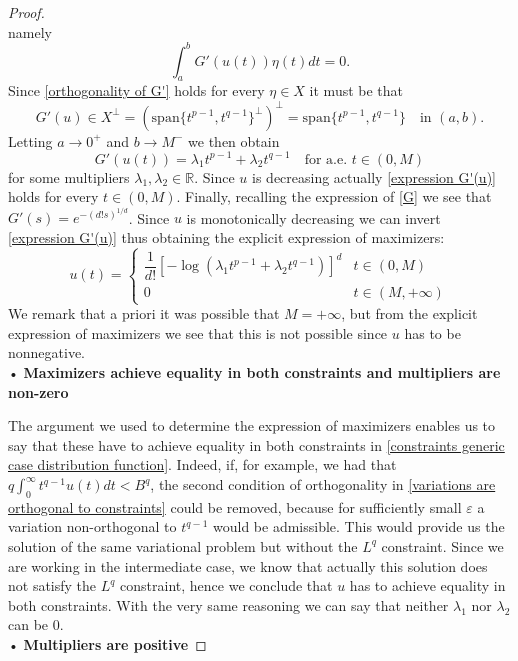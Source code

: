 \documentclass[corpo=11pt, stile=classica, tipotesi=custom,
greek, evenboxes, english]{toptesi}
\numberwithin{equation}{chapter}
\theoremstyle{definition}
\theoremstyle{remark}
\newcommand{\R}{\mathbb{R}} %
\begin{document}
\begin{proof}
\begin{equation*}
\end{equation*}
namely
\begin{equation}\label{orthogonality of G'}
	\int_a^b G'(u(t)) \eta(t) dt = 0. 
\end{equation}
Since \eqref{orthogonality of G'} holds for every $\eta \in X$ it must be that 
\begin{equation*}
	G'(u) \in X^{\perp} = \left(\mathrm{span}\{t^{p-1},t^{q-1}\}^{\perp}\right)^{\perp} = \mathrm{span}\{t^{p-1},t^{q-1}\} \quad \text{in } (a,b).
\end{equation*}
Letting $a \rightarrow 0^+$ and $b \rightarrow M^-$ we then obtain
\begin{equation}\label{expression G'(u)}
	G'(u(t)) = \lambda_1 t^{p-1} + \lambda_2 t^{q-1} \quad \text{for a.e. } t \in (0,M)
\end{equation}
for some multipliers $\lambda_1,\lambda_2 \in \R$. Since $u$ is decreasing actually \eqref{expression G'(u)} holds for every $t \in (0,M)$. Finally, recalling the expression of \eqref{G} we see that $G'(s) = e^{-(d!s)^{1/d}}$. Since $u$ is monotonically decreasing we can invert \eqref{expression G'(u)} thus obtaining the explicit expression of maximizers:
\begin{equation}\label{expression u}
	u(t) = \begin{cases}
		\dfrac{1}{d!} \left[-\log\left(\lambda_1 t^{p-1} + \lambda_2 t^{q-1}\right) \right]^d & t \in (0,M)\\
		0 & t \in (M,+\infty)
	\end{cases}
\end{equation}
We remark that a priori it was possible that $M=+\infty$, but from the explicit expression of maximizers we see that this is not possible since $u$ has to be nonnegative.\\
• \textbf{Maximizers achieve equality in both constraints and multipliers are non-zero}

The argument we used to determine the expression of maximizers enables us to say that these have to achieve equality in both constraints in \eqref{constraints generic case distribution function}. Indeed, if, for example, we had that $q \int_0^{\infty} t^{q-1}u(t)dt < B^q$, the second condition of orthogonality in \eqref{variations are orthogonal to constraints} could be removed, because for sufficiently small $\varepsilon$ a variation non-orthogonal to $t^{q-1}$ would be admissible. This would provide us the solution of the same variational problem but without the $L^q$ constraint. Since we are working in the intermediate case, we know that actually this solution does not satisfy the $L^q$ constraint, hence we conclude that $u$ has to achieve equality in both constraints. With the very same reasoning we can say that neither $\lambda_1$ nor $\lambda_2$ can be 0.\\
• \textbf{Multipliers are positive}


\end{proof}
\end{document}
